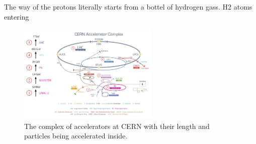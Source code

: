 The way of the protons literally starts from a bottel of hydrogen gass.
H2 atoms entering 


\begin{figure}[t]
  \centering
  \includegraphics[width=0.6\textwidth]{02_experimental_setup/plots/Cern-Accelerator-Complex-2.png}
  \caption{The complex of accelerators at CERN with their length and particles being accelerated inside.}
  \label{fig:AccelCERN}
\end{figure}


